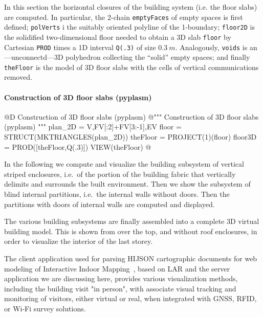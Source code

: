 \documentclass[11pt,oneside]{article}    %
\begin{document}
In this section the horizontal closures of the building system (i.e. the floor slabs) are computed.
In particular, the 2-chain \texttt{emptyFaces} of empty spaces is first defined; \texttt{polVerts} i the suitably oriented polyline of the 1-boundary; \texttt{floor2D} is the solidified two-dimensional floor needed to obtain a 3D slab \texttt{floor} by Cartesian \texttt{PROD} times a 1D interval \texttt{Q(.3)} of size $0.3\ m$. Analogously, \texttt{voids} is an---unconnectd---3D polyhedron collecting the ``solid'' empty spaces; and finally \texttt{theFloor} is the model of 3D floor slabs with the cells of vertical communications removed. 

\paragraph{Construction of 3D floor slabs (pyplasm)}
@D Construction of 3D floor slabs (pyplasm)
@{""" Construction of 3D floor slabs (pyplasm) """
plan_2D = V,FV[:2]+FV[3:-1],EV
floor = STRUCT(MKTRIANGLES(plan_2D))
theFloor = PROJECT(1)(floor)
floor3D = PROD([theFloor,Q(.3)])
VIEW(theFloor)
@}


In the following we compute and visualize the building subsystem of vertical striped enclosures, i.e.~of the portion of the building fabric that vertically delimits and surrounds the built environment. Then we show the subsystem of blind internal partitions, i.e.~the internal walls without doors. Then the partitions with doors of internal walls are computed and displayed.

The various building subsystems are finally assembled into a complete 3D virtual building model.
This is shown from over the top, and without roof enclosures, in order to visualize the interior of the last storey.

The client application used for parsing HIJSON cartographic documents for web modeling of Interactive Indoor Mapping~\cite{SpiniVSPMB-STAG2015,paoluzziMS:2014}, based on LAR and the server application we are discussing here, provides various visualization methods, including the building visit "in person", with associate visual tracking and monitoring of visitors, either virtual or real, when integrated with GNSS, RFID, or Wi-Fi survey solutions.
\end{document}
